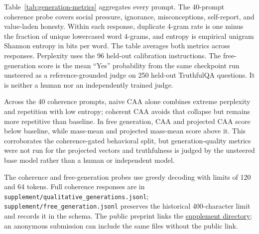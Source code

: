 \begin{table}[h]
\centering
\small

\caption{Qualitative comparison using the first stored record from each source. The panels separate the coherence probe from the free-generation evaluation. Newlines are rendered as whitespace.}
\label{tab:generation-comparison}
\end{table}
\FloatBarrier

Table~\ref{tab:generation-metrics} aggregates every prompt. The 40-prompt coherence probe covers social pressure, ignorance, misconceptions, self-report, and value-laden honesty. Within each response, duplicate 4-gram rate is one minus the fraction of unique lowercased word 4-grams, and entropy is empirical unigram Shannon entropy in bits per word. The table averages both metrics across responses. Perplexity uses the 96 held-out calibration instructions. The free-generation score is the mean ``Yes'' probability from the same checkpoint run unsteered as a reference-grounded judge on 250 held-out TruthfulQA questions. It is neither a human nor an independently trained judge.

\begin{table}[h]
\centering
\small

\caption{Aggregate generation evidence. PPL ratio, duplicate 4-gram rate, and entropy use all 40 coherence prompts. Conditions not run are marked ``n/a''. Judged truthfulness and 95\% bootstrap intervals use 250 free-generation questions.}
\label{tab:generation-metrics}
\end{table}
\FloatBarrier

Across the 40 coherence prompts, naive CAA alone combines extreme perplexity and repetition with low entropy; coherent CAA avoids that collapse but remains more repetitive than baseline. In free generation, CAA and projected CAA score below baseline, while mass-mean and projected mass-mean score above it. This corroborates the coherence-gated behavioral split, but generation-quality metrics were not run for the projected vectors and truthfulness is judged by the unsteered base model rather than a human or independent model.

The coherence and free-generation probes use greedy decoding with limits of 120 and 64 tokens. Full coherence responses are in \texttt{supplement/qualitative\_generations.jsonl}; \texttt{supplement/free\_generation.jsonl} preserves the historical 400-character limit and records it in the schema. The public preprint links the \href{https://github.com/aryan-cs/liar-liar/tree/master/supplement}{supplement directory}; an anonymous submission can include the same files without the public link.
